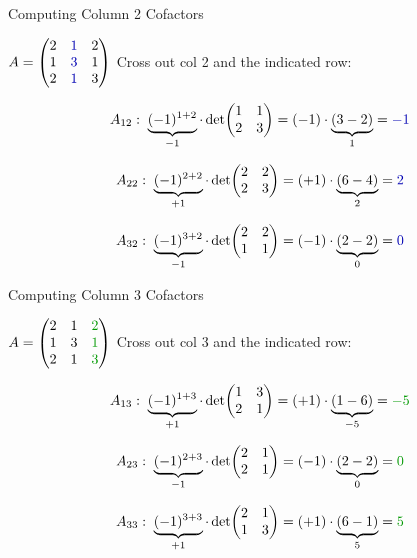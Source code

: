 \documentclass[10pt]{beamer}
\theoremstyle{definition}
\newcommand{\bl}[1]{{\color{blue!70!black}#1}}
\newcommand{\gn}[1]{{\color{green!60!black}#1}}
\begin{document}
\begin{frame}{Computing \bl{Column 2} Cofactors}

$A = \begin{pmatrix} 2 & \bl{1} & 2 \\ 1 & \bl{3} & 1 \\ 2 & \bl{1} & 3 \end{pmatrix}$
\quad Cross out \bl{col 2} and the indicated row:

{\small
$$
A_{12}:\;
\underbrace{(-1)^{1+2}}_{-1} \cdot \det\!\begin{pmatrix} 1 & 1 \\ 2 & 3 \end{pmatrix}
= (-1)\cdot\underbrace{(3-2)}_{1} = \bl{{-}1}
$$

\vfill

$$
A_{22}:\;
\underbrace{(-1)^{2+2}}_{+1} \cdot \det\!\begin{pmatrix} 2 & 2 \\ 2 & 3 \end{pmatrix}
= (+1)\cdot\underbrace{(6-4)}_{2} = \bl{2}
$$

\vfill

$$
A_{32}:\;
\underbrace{(-1)^{3+2}}_{-1} \cdot \det\!\begin{pmatrix} 2 & 2 \\ 1 & 1 \end{pmatrix}
= (-1)\cdot\underbrace{(2-2)}_{0} = \bl{0}
$$
}

\end{frame}


\begin{frame}{Computing \gn{Column 3} Cofactors}

$A = \begin{pmatrix} 2 & 1 & \gn{2} \\ 1 & 3 & \gn{1} \\ 2 & 1 & \gn{3} \end{pmatrix}$
\quad Cross out \gn{col 3} and the indicated row:

{\small
$$
A_{13}:\;
\underbrace{(-1)^{1+3}}_{+1} \cdot \det\!\begin{pmatrix} 1 & 3 \\ 2 & 1 \end{pmatrix}
= (+1)\cdot\underbrace{(1-6)}_{-5} = \gn{{-}5}
$$

\vfill

$$
A_{23}:\;
\underbrace{(-1)^{2+3}}_{-1} \cdot \det\!\begin{pmatrix} 2 & 1 \\ 2 & 1 \end{pmatrix}
= (-1)\cdot\underbrace{(2-2)}_{0} = \gn{0}
$$

\vfill

$$
A_{33}:\;
\underbrace{(-1)^{3+3}}_{+1} \cdot \det\!\begin{pmatrix} 2 & 1 \\ 1 & 3 \end{pmatrix}
= (+1)\cdot\underbrace{(6-1)}_{5} = \gn{5}
$$
}

\end{frame}
\end{document}
